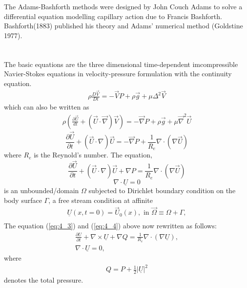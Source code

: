 \documentclass[11pt]{report}
\newcommand{\sps}{\\[0.2cm]}
\newcommand{\refn}[1]{(\ref{#1})}
\newcommand{\refx}[1]{\refn{eq:#1}}
\newcommand{\NI}{\noindent}
\begin{document}
	\NI The Adams-Bashforth methods were designed by John Couch Adams to solve a differential equation modelling capillary action due to Francis Bashforth. Bashforth(1883) published his theory and Adams' numerical method (Goldstine 1977).
	
	
	\chapter{}
	The basic equations are the three dimensional time-dependent imcompressible Navier-Stokes equations in velocity-pressure formulation with the continuity equation.
	\begin{eqnarray}
		\rho\frac{D\vec{V}}{Dt} = -\vec{V} P + \rho\vec{g} + \mu \Delta^2\vec{V}
	\end{eqnarray}
	which can also be written as
	\begin{eqnarray}
		\rho\left(\frac{\partial \vec{U}}{dt} + (\vec{U}\cdot \vec{\nabla})\vec{V}\right) = -\vec{\nabla}P + \rho\vec{g} + \mu\vec{\nabla}^2\vec{U}
	\end{eqnarray}
	\begin{equation*}
		\frac{\partial\vec{U}}{\partial t} + (\vec{U}\cdot\nabla)\vec{U} = -\vec{\nabla}P + \frac{1}{R_e} \nabla \cdot (\nabla\vec{U})
	\end{equation*}
	where $R_e$ is the Reynold's number. The equation,
	\begin{equation}
		\frac{\partial \vec{U}}{\partial t} + (\vec{U}\cdot\nabla)\vec{U} + \nabla P = \frac{1}{R_e}\nabla\cdot(\nabla\vec{U})\label{eq:4_3}
	\end{equation}
	\begin{equation}
		\nabla \cdot \underline{U} = 0\label{eq:4_4}
	\end{equation}
	is an unbounded/domain $\Omega$ subjected to Dirichlet boundary condition on the body surface $\Gamma$, a free stream condition at affinite
	\begin{eqnarray*}
		\underline{U}(x,t=0) = \vec{U}_0(x), \text{ in } \vec{\Omega} \equiv \Omega + \Gamma,\sps
	\end{eqnarray*}
	The equation \refx{4_3} and \refx{4_4} above now rewritten as follows:
	\begin{gather}
		\frac{\partial U}{\partial t} + \nabla\times\underline{U} + \nabla Q = \frac{1}{R_e}\nabla \cdot (\nabla\underline{U}),\label{eq:4_5}\sps
		\nabla\cdot\underline{U} = 0,\label{eq:4_6}
	\end{gather}
	where 
	\begin{eqnarray*}
		Q = P + \frac{1}{2}\Bigg|\underline{U}\Bigg|^2
	\end{eqnarray*}
	denotes the total pressure.\\
	
\end{document}
